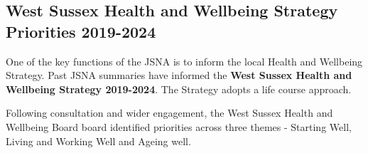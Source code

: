 


\subsection{West Sussex Health and Wellbeing Strategy Priorities 2019-2024}
One of the key functions of the JSNA is to inform the local Health and Wellbeing Strategy. Past JSNA summaries have informed the {\bf West Sussex Health and Wellbeing Strategy 2019-2024}. The Strategy adopts a life course approach. 

Following consultation and wider engagement, the West Sussex Health and Wellbeing Board board identified priorities across three themes - Starting Well, Living and Working Well and Ageing well.


